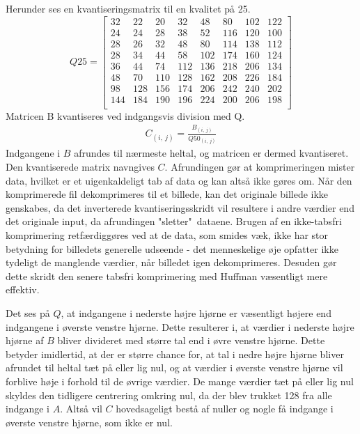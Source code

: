 Herunder ses en kvantiseringsmatrix til en kvalitet på 25.
\begin{equation}
Q25 =
\begin{bmatrix}
	32	&	22	& 20		& 32		& 	48	&	80	& 102	& 122	\\
	24	&	24	& 28		& 38		& 	52	& 	116	& 120	& 100	\\
	28	&	26	& 32		& 48		& 	80	& 	114	& 138	& 112	\\
	28	&	34	& 44		& 58		& 	102	& 	174	& 160	& 124	\\
	36	&	44	& 74		& 112	& 	136	& 	218	& 206	& 134	\\
	48	&	70	& 110	& 128	& 	162	& 	208	& 226	& 184	\\
	98	&	128	& 156	& 174	& 	206	& 	242	& 240	& 202	\\
	144	&	184	& 190	& 196	& 	224	& 	200	& 206	& 198	\\
\end{bmatrix}
\label{eq:Q25teori}
\end{equation}
Matricen B kvantiseres ved indgangsvis division med Q.
\begin{align}
C_{(i,\ j)}=\frac{B_{(i,\ j)}}{Q50_{(i,\ j)}}
\label{C_beregning}
\end{align}
Indgangene i $B$ afrundes til nærmeste heltal, og matricen er dermed kvantiseret. Den kvantiserede matrix navngives $C$. Afrundingen gør at komprimeringen mister data, hvilket er et uigenkaldeligt tab af data og kan altså ikke gøres om. Når den komprimerede fil dekomprimeres til et billede, kan det originale billede ikke genskabes, da det inverterede kvantiseringsskridt vil resultere i andre værdier end det originale input, da afrundingen "sletter"\ dataene. Brugen af en ikke-tabsfri komprimering retfærdiggøres ved at de data, som smides væk, ikke har stor betydning for billedets generelle udseende - det menneskelige øje opfatter ikke tydeligt de manglende værdier, når billedet igen dekomprimeres. Desuden gør dette skridt den senere tabsfri komprimering med Huffman væsentligt mere effektiv.

Det ses på $Q$, at indgangene i nederste højre hjørne er væsentligt højere end indgangene i øverste venstre hjørne. Dette resulterer i, at værdier i nederste højre hjørne af $B$ bliver divideret med større tal end i øvre venstre hjørne. Dette betyder imidlertid, at der er større chance for, at tal i nedre højre hjørne bliver afrundet til heltal tæt på eller lig nul, og at værdier i øverste venstre hjørne vil forblive høje i forhold til de øvrige værdier. De mange værdier tæt på eller lig nul skyldes den tidligere centrering omkring nul, da der blev trukket 128 fra alle indgange i $A$. Altså vil $C$ hovedsageligt bestå af nuller og nogle få indgange i øverste venstre hjørne, som ikke er nul.
					
